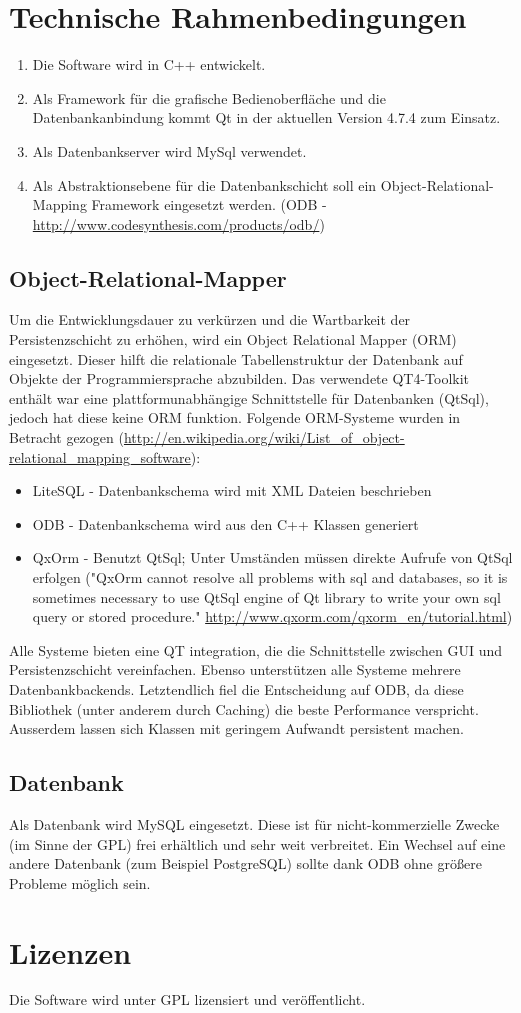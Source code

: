 \documentclass[a4paper,10pt]{article}
\begin{document}
\section{Technische Rahmenbedingungen}
\begin{enumerate}
	\item Die Software wird in C++ entwickelt.
	\item Als Framework für die grafische Bedienoberfläche und die Datenbankanbindung kommt Qt in der aktuellen Version 4.7.4 zum Einsatz.
	\item Als Datenbankserver wird MySql verwendet.
	\item Als Abstraktionsebene für die Datenbankschicht soll ein Object-Relational-Mapping Framework eingesetzt werden. (ODB - \url{http://www.codesynthesis.com/products/odb/})
\end{enumerate}
\subsection{Object-Relational-Mapper}
Um die Entwicklungsdauer zu verkürzen und die Wartbarkeit der Persistenzschicht zu erhöhen, wird ein Object Relational Mapper (ORM) eingesetzt. Dieser hilft die relationale Tabellenstruktur der Datenbank auf Objekte der Programmiersprache abzubilden.
Das verwendete QT4-Toolkit enthält war eine plattformunabhängige Schnittstelle für Datenbanken (QtSql), jedoch hat diese keine ORM funktion.
Folgende ORM-Systeme wurden in Betracht gezogen (\url{http://en.wikipedia.org/wiki/List_of_object-relational_mapping_software}):
\begin{itemize}
	\item LiteSQL - Datenbankschema wird mit XML Dateien beschrieben
	\item ODB - Datenbankschema wird aus den C++ Klassen generiert
	\item QxOrm - Benutzt QtSql; Unter Umständen müssen direkte Aufrufe von QtSql erfolgen ("QxOrm cannot resolve all problems with sql and databases, so it is sometimes necessary to use QtSql engine of Qt library to write your own sql query or stored procedure." \url{http://www.qxorm.com/qxorm_en/tutorial.html})
\end{itemize}
Alle Systeme bieten eine QT integration, die die Schnittstelle zwischen GUI und Persistenzschicht vereinfachen. Ebenso unterstützen alle Systeme mehrere Datenbankbackends.
Letztendlich fiel die Entscheidung auf ODB, da diese Bibliothek (unter anderem durch Caching) die beste Performance verspricht. Ausserdem lassen sich Klassen mit geringem Aufwandt persistent machen.
\subsection{Datenbank}
Als Datenbank wird MySQL eingesetzt. Diese ist für nicht-kommerzielle Zwecke (im Sinne der GPL) frei erhältlich und sehr weit verbreitet. Ein Wechsel auf eine andere Datenbank (zum Beispiel PostgreSQL) sollte dank ODB ohne größere Probleme möglich sein.


\section{Lizenzen}
Die Software wird unter GPL lizensiert und veröffentlicht.
\end{document}

